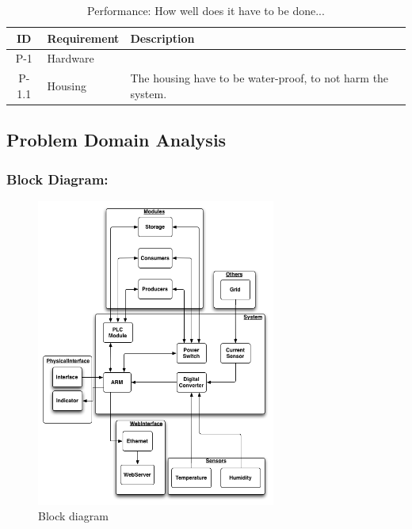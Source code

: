 		\begin{table}[H]
			\begin{tabular} [b] {| c | p{3cm} | p{10cm} |}
			\hline
			\textbf{ID} & \textbf{Requirement} & \textbf{Description} \\\hline
			P-1 & Hardware 		&  \\ \hline
			P-1.1 & Housing 		& The housing have to be water-proof, to not harm the system.\\ \hline
		\end{tabular}
		\caption{Performance: How well does it have to be done...}
		\end{table}
	\subsection{Problem Domain Analysis}

			\subsubsection{Block Diagram:}
			\begin{figure}[H]
				\begin{centering}
					 \includegraphics[width=0.7\textwidth]{images/block_diagram.png}
		 			\caption{Block diagram}
			 	\end{centering}
			\end{figure}

